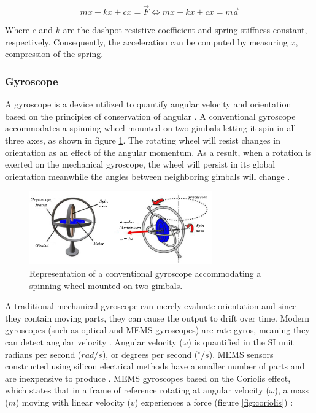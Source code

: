 \begin{equation}
    mx + kx + cx = \overrightarrow{F}\Leftrightarrow mx + kx + cx = m\overrightarrow{a}
\end{equation}

Where $c$ and $k$ are the dashpot resistive coefficient and spring stiffness constant, respectively. Consequently, the acceleration can be computed by measuring $x$, compression of the spring.


\subsubsection{Gyroscope}

A gyroscope is a device utilized to quantify angular velocity and orientation based on the principles of conservation of angular  \cite{zhuang2020introductory}. A conventional gyroscope accommodates a spinning wheel mounted on two gimbals letting it spin in all three axes, as shown in figure \ref{fig:gyroscope}. The rotating wheel will resist changes in orientation as an effect of the angular momentum. As a result, when a rotation is exerted on the mechanical gyroscope, the wheel will persist in its global orientation meanwhile the angles between neighboring gimbals will change \cite{marotto2013orientation}.

\begin{figure}[!h]
    \centering
    \includegraphics[width=0.7\textwidth]{figures/gyroscope.pdf}
    \caption{ Representation of a conventional gyroscope accommodating a spinning wheel mounted on two gimbals. \cite{marotto2013orientation} }
    \label{fig:gyroscope}
\end{figure}

A traditional mechanical gyroscope can merely evaluate orientation and since they contain moving parts, they can cause the output to drift over time. Modern gyroscopes (such as optical and MEMS gyroscopes) are rate-gyros, meaning they can detect angular velocity \cite{antonello2011mems}. Angular velocity ($\omega$) is quantified in the SI unit radians per second ($rad/s$), or degrees per second ($^{\circ}/s$). MEMS sensors constructed using silicon electrical methods have a smaller number of parts and are inexpensive to produce \cite{antonello2012exploring}. MEMS gyroscopes based on the Coriolis effect, which states that in a frame of reference rotating at angular velocity ($\omega$), a mass ($m$) moving with linear velocity ($v$) experiences a force (figure \ref{fig:coriolis}) \cite{trusov2011overview}:

